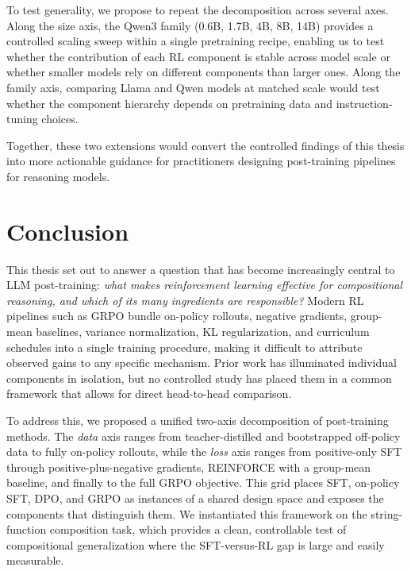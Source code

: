 \documentclass[12pt]{cmuthesis}
\begin{document}
To test generality, we propose to repeat the decomposition across several axes. Along the size axis, the Qwen3 family (0.6B, 1.7B, 4B, 8B, 14B) provides a controlled scaling sweep within a single pretraining recipe, enabling us to test whether the contribution of each RL component is stable across model scale or whether smaller models rely on different components than larger ones. Along the family axis, comparing Llama and Qwen models at matched scale would test whether the component hierarchy depends on pretraining data and instruction-tuning choices. 

\vspace{1em}
Together, these two extensions would convert the controlled findings of this thesis into more actionable guidance for practitioners designing post-training pipelines for reasoning models.


\chapter{Conclusion}

This thesis set out to answer a question that has become increasingly central to LLM post-training: \emph{what makes reinforcement learning effective for compositional reasoning, and which of its many ingredients are responsible?} Modern RL pipelines such as GRPO bundle on-policy rollouts, negative gradients, group-mean baselines, variance normalization, KL regularization, and curriculum schedules into a single training procedure, making it difficult to attribute observed gains to any specific mechanism. Prior work has illuminated individual components in isolation, but no controlled study has placed them in a common framework that allows for direct head-to-head comparison.

To address this, we proposed a unified two-axis decomposition of post-training methods. The \emph{data} axis ranges from teacher-distilled and bootstrapped off-policy data to fully on-policy rollouts, while the \emph{loss} axis ranges from positive-only SFT through positive-plus-negative gradients, REINFORCE with a group-mean baseline, and finally to the full GRPO objective. This grid places SFT, on-policy SFT, DPO, and GRPO as instances of a shared design space and exposes the components that distinguish them. We instantiated this framework on the string-function composition task, which provides a clean, controllable test of compositional generalization where the SFT-versus-RL gap is large and easily measurable.
\end{document}
